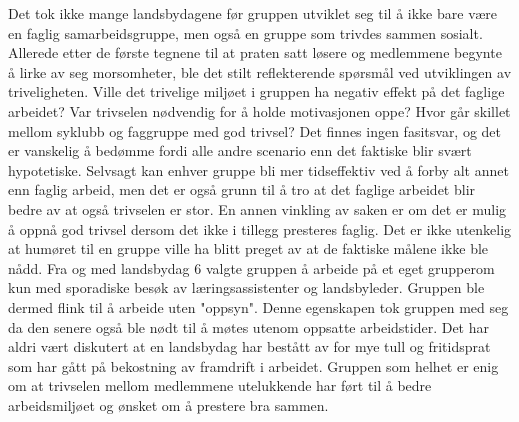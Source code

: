 Det tok ikke mange landsbydagene før gruppen utviklet seg til å ikke bare være en faglig samarbeidsgruppe, men også en gruppe som trivdes sammen sosialt. 
Allerede etter de første tegnene til at praten satt løsere og medlemmene begynte å lirke av seg morsomheter, ble det stilt reflekterende spørsmål ved utviklingen av triveligheten.
Ville det trivelige miljøet i gruppen ha negativ effekt på det faglige arbeidet?
Var trivselen nødvendig for å holde motivasjonen oppe? 
Hvor går skillet mellom syklubb og faggruppe med god trivsel?
Det finnes ingen fasitsvar, og det er vanskelig å bedømme fordi alle andre scenario enn det faktiske blir svært hypotetiske.
Selvsagt kan enhver gruppe bli mer tidseffektiv ved å forby alt annet enn faglig arbeid, men det er også grunn til å tro at det faglige arbeidet blir bedre av at også trivselen er stor.
En annen vinkling av saken er om det er mulig å oppnå god trivsel dersom det ikke i tillegg presteres faglig.
Det er ikke utenkelig at humøret til en gruppe ville ha blitt preget av at de faktiske målene ikke ble nådd.
Fra og med landsbydag 6 valgte gruppen å arbeide på et eget grupperom kun med sporadiske besøk av læringsassistenter og landsbyleder.
Gruppen ble dermed flink til å arbeide uten "oppsyn".
Denne egenskapen tok gruppen med seg da den senere også ble nødt til å møtes utenom oppsatte arbeidstider.
Det har aldri vært diskutert at en landsbydag har bestått av for mye tull og fritidsprat som har gått på bekostning av framdrift i arbeidet.
Gruppen som helhet er enig om at trivselen mellom medlemmene utelukkende har ført til å bedre arbeidsmiljøet og ønsket om å prestere bra sammen. 
























